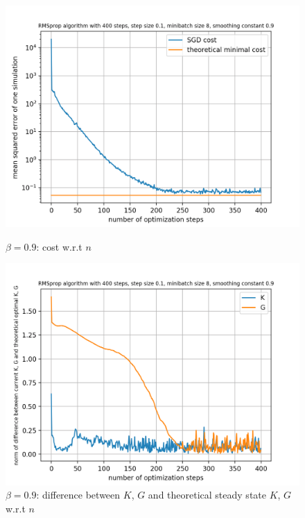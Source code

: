 \documentclass{article}
\begin{document}
\begin{figure}[h!]
	\centering
	\begin{minipage}[t]{.28\paperwidth}
		\centering
		\includegraphics[width=1.0\textwidth]{Figures/beta0_9.png}
		\caption{$\beta = 0.9$: cost w.r.t $n$}
	\end{minipage}%
	\begin{minipage}[t]{.28\paperwidth}
		\centering
		\includegraphics[width=1.0\textwidth]{Figures/d_beta_0_9.png}
		\caption{$\beta = 0.9$: difference between $K$, $G$ and theoretical steady state $K$, $G$ w.r.t $n$}
	\end{minipage}%
	\begin{minipage}[t]{.28\paperwidth}
		\centering

\end{minipage}
\end{figure}
\end{document}
